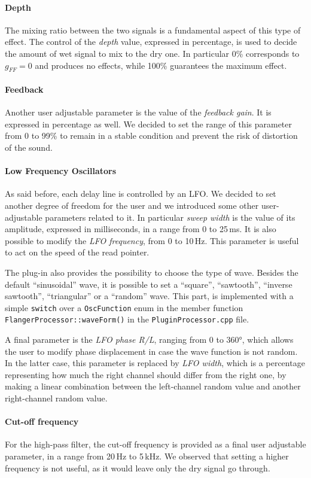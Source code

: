 \paragraph{Depth}
The mixing ratio between the two signals is a fundamental aspect of this type of effect. The control of the \emph{depth} value, expressed in percentage, is used to decide the amount of wet signal to mix to the dry one. In particular 0\% corresponds to $g_{FF} = 0$ and produces no effects, while 100\% guarantees the maximum effect.

\paragraph{Feedback}
Another user adjustable parameter is the value of the \emph{feedback gain}. It is expressed in percentage as well.
We decided to set the range of this parameter from 0 to 99\% to remain in a stable condition and prevent the risk of distortion of the sound.

\paragraph{Low Frequency Oscillators}
As said before, each delay line is controlled by an LFO.
We decided to set another degree of freedom for the user and we introduced some other user-adjustable parameters related to it.
In particular \emph{sweep width} is the value of its amplitude, expressed in milliseconds, in a range from 0 to 25\,ms.
It is also possible to modify the \emph{LFO frequency}, from 0 to 10\,Hz.
This parameter is useful to act on the speed of the read pointer.

The plug-in also provides the possibility to choose the type of wave.
Besides the default ``sinusoidal'' wave, it is possible to set a ``square'', ``sawtooth'', ``inverse sawtooth'', ``triangular'' or a ``random'' wave.
This part, is implemented with a simple \texttt{switch} over a \texttt{OscFunction} enum in the member function \texttt{FlangerProcessor::waveForm()} in the \texttt{PluginProcessor.cpp} file.

A final parameter is the \emph{LFO phase R/L}, ranging from 0 to 360°, which allows the user to modify phase displacement in case the wave function is not random. In the latter case, this parameter is replaced by \emph{LFO width}, which is a percentage representing how much the right channel should differ from the right one, by making a linear combination between the left-channel random value and another right-channel random value.

\paragraph{Cut-off frequency}
For the high-pass filter, the cut-off frequency is provided as a final user adjustable parameter, in a range from 20\,Hz to 5\,kHz. We observed that setting a higher frequency is not useful, as it would leave only the dry signal go through.